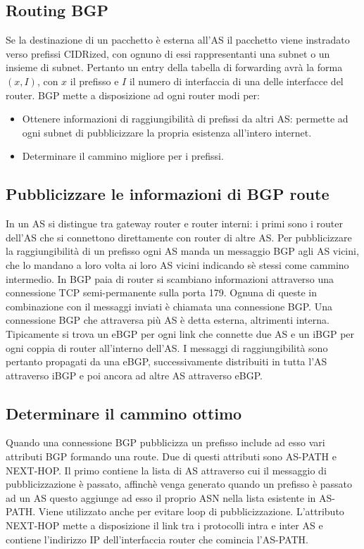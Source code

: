 \subsection{Routing BGP}
Se la destinazione di un pacchetto \`e esterna all'AS il pacchetto viene instradato verso prefissi CIDRized, con ognuno di essi rappresentanti una subnet o
un insieme di subnet. Pertanto un entry della tabella di forwarding avr\`a la forma $(x, I)$, con $x$ il prefisso e $I$ il numero di interfaccia di una 
delle interfacce del router. BGP mette a disposizione ad ogni router modi per:
\begin{itemize}
\item Ottenere informazioni di raggiungibilit\`a di prefissi da altri AS: permette ad ogni subnet di pubblicizzare la propria esistenza all'intero internet.
\item Determinare il cammino migliore per i prefissi.
\end{itemize}
\subsection{Pubblicizzare le informazioni di BGP route}
In un AS si distingue tra gateway router e router interni: i primi sono i router dell'AS che si connettono direttamente con router di altre AS. Per 
pubblicizzare la raggiungibilit\`a di un prefisso ogni AS manda un messaggio BGP agli AS vicini, che lo mandano a loro volta ai loro AS vicini indicando 
s\`e stessi come cammino intermedio. In BGP paia di router si scambiano informazioni attraverso una connessione TCP semi-permanente sulla porta 179. Ognuna
di queste in combinazione con il messaggi inviati \`e chiamata una connessione BGP. Una connessione BGP che attraversa pi\`u AS \`e detta esterna, 
altrimenti interna. Tipicamente si trova un eBGP per ogni link che connette due AS e un iBGP per ogni coppia di router all'interno dell'AS. I messaggi di 
raggiungibilit\`a sono pertanto propagati da una eBGP, successivamente distribuiti in tutta l'AS attraverso iBGP e poi ancora ad altre AS attraverso eBGP.
\subsection{Determinare il cammino ottimo}
Quando una connessione BGP pubblicizza un prefisso include ad esso vari attributi BGP formando una route. Due di questi attributi sono AS-PATH e NEXT-HOP.
Il primo contiene la lista di AS attraverso cui il messaggio di pubblicizzazione \`e passato, affinch\`e venga generato quando un prefisso \`e passato
ad un AS questo aggiunge ad esso il proprio ASN nella lista esistente in AS-PATH. Viene utilizzato anche per evitare loop di pubblicizzazione. L'attributo 
NEXT-HOP mette a disposizione il link tra i protocolli intra e inter AS e contiene l'indirizzo IP dell'interfaccia router che comincia l'AS-PATH.
